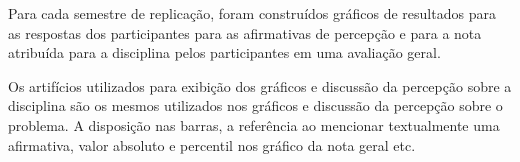 

Para cada semestre de replicação, foram construídos gráficos
de resultados para as respostas dos participantes para as afirmativas
de percepção e para a nota atribuída para a disciplina pelos participantes
em uma avaliação geral.

Os artifícios utilizados para exibição dos gráficos e
discussão da percepção sobre a disciplina são os mesmos
utilizados nos gráficos e discussão da percepção sobre
o problema.
A disposição nas barras, a referência ao mencionar textualmente
uma afirmativa, valor absoluto e percentil nos gráfico da
nota geral etc.










